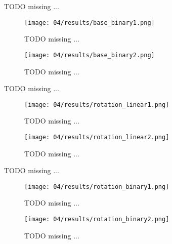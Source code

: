     \colorbox{BurntOrange}{TODO missing ...}

    \begin{figure}[H]
      \centering
      \texttt{[image: 04/results/base\_binary1.png]}
      \caption{
        \colorbox{BurntOrange}{TODO missing ...}
      }
      \label{fig:SAT_results_base_binary1}
    \end{figure}
    \begin{figure}[H]
      \centering
      \texttt{[image: 04/results/base\_binary2.png]}
      \caption{
        \colorbox{BurntOrange}{TODO missing ...}
      }
      \label{fig:SAT_results_base_binary2}
    \end{figure}


    \colorbox{BurntOrange}{TODO missing ...}

    \begin{figure}[H]
      \centering
      \texttt{[image: 04/results/rotation\_linear1.png]}
      \caption{
        \colorbox{BurntOrange}{TODO missing ...}
      }
      \label{fig:SAT_results_rotation_linear1}
    \end{figure}
    \begin{figure}[H]
      \centering
      \texttt{[image: 04/results/rotation\_linear2.png]}
      \caption{
        \colorbox{BurntOrange}{TODO missing ...}
      }
      \label{fig:SAT_results_rotation_linear2}
    \end{figure}

    \colorbox{BurntOrange}{TODO missing ...}

    \begin{figure}[H]
      \centering
      \texttt{[image: 04/results/rotation\_binary1.png]}
      \caption{
        \colorbox{BurntOrange}{TODO missing ...}
      }
      \label{fig:SAT_results_rotation_binary1}
    \end{figure}
    \begin{figure}[H]
      \centering
      \texttt{[image: 04/results/rotation\_binary2.png]}
      \caption{
        \colorbox{BurntOrange}{TODO missing ...}
      }
      \label{fig:SAT_results_rotation_binary2}
    \end{figure}

